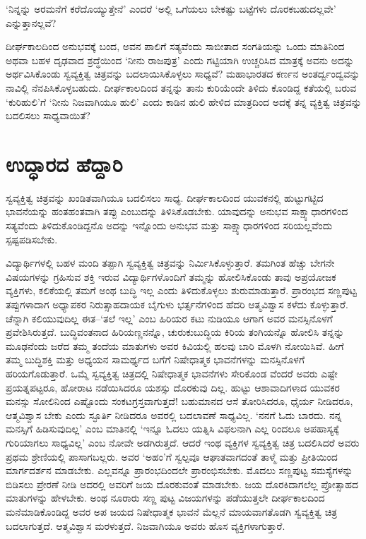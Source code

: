 ‘ನಿನ್ನನ್ನು ಅರಮನೆಗೆ ಕರೆದೊಯ್ಯುತ್ತೇನೆ’ ಎಂದರೆ ‘ಅಲ್ಲಿ ಒಗೆಯಲು ಬೇಕಷ್ಟು ಬಟ್ಟೆಗಳು ದೊರಕಬಹುದಲ್ಲವೇ’ ಎನ್ನುತ್ತಾನಲ್ಲವೆ?

ದೀರ್ಘಕಾಲದಿಂದ ಅನುಭವಕ್ಕೆ ಬಂದ, ಅವನ ಪಾಲಿಗೆ ಸತ್ಯವೆಂದು ಸಾಬೀತಾದ ಸಂಗತಿಯನ್ನು ಒಂದು ಮಾತಿನಿಂದ ಅಥವಾ ಬಹಳ ದೃಢವಾದ ಶ್ರದ್ಧೆಯಿಂದ ‘ನೀನು ರಾಜಪುತ್ರ’ ಎಂದು ಗಟ್ಟಿಯಾಗಿ ಉಚ್ಚರಿಸಿದ ಮಾತ್ರಕ್ಕೆ ಅವನು ಅದನ್ನು ಅರ್ಥವಿಸಿಕೊಂಡು ಸ್ವವ್ಯಕ್ತಿತ್ವ ಚಿತ್ರವನ್ನು ಬದಲಾಯಿಸಿಕೊಳ್ಳಲು ಸಾಧ್ಯವೆ? ಮಹಾಭಾರತದ ಕರ್ಣನ ಅಂತರ್ದ್ವಂದ್ವವನ್ನು ನಾವಿಲ್ಲಿ ನೆನಪಿಸಿಕೊಳ್ಳಬಹುದು. ದೀರ್ಘಕಾಲದಿಂದ ತನ್ನನ್ನು ತಾನು ಕುರಿಯೆಂದೇ ತಿಳಿದು ಕೊಂಡಿದ್ದ ಕತೆಯಲ್ಲಿ ಬರುವ ‘ಕುರಿಹುಲಿ’ಗೆ ‘ನೀನು ನಿಜವಾಗಿಯೂ ಹುಲಿ’ ಎಂದು ಕಾಡಿನ ಹುಲಿ ಹೇಳಿದ ಮಾತ್ರದಿಂದ ಅದಕ್ಕೆ ತನ್ನ ವ್ಯಕ್ತಿತ್ವ ಚಿತ್ರವನ್ನು ಬದಲಿಸಲು ಸಾಧ್ಯವಾಯಿತೆ?


\section*{ಉದ್ಧಾರದ ಹೆದ್ದಾರಿ}

ಸ್ವವ್ಯಕ್ತಿತ್ವ ಚಿತ್ರವನ್ನು ಖಂಡಿತವಾಗಿಯೂ ಬದಲಿಸಲು ಸಾಧ್ಯ. ದೀರ್ಘಕಾಲದಿಂದ ಯುವಕನಲ್ಲಿ ಹುಟ್ಟುಗಟ್ಟಿದ ಭಾವನೆಯನ್ನು ಹಂತಹಂತವಾಗಿ ತಪ್ಪು ಎಂಬುದನ್ನು ತಿಳಿಸಿಕೊಡಬೇಕು. ಯಾವುದನ್ನು ಅನುಭವ ಸಾಕ್ಷ್ಯಾಧಾರಗಳಿಂದ ಸತ್ಯವೆಂದು ತಿಳಿದುಕೊಂಡಿದ್ದನೊ ಅದನ್ನು ಇನ್ನೊಂದು ಅನುಭವ ಮತ್ತು ಸಾಕ್ಷ್ಯಾಧಾರಗಳಿಂದ ಸರಿಯಲ್ಲವೆಂದು ಸ್ಪಷ್ಟಪಡಿಸಬೇಕು.

ವಿದ್ಯಾರ್ಥಿಗಳಲ್ಲಿ ಬಹಳ ಮಂದಿ ತಪ್ಪಾಗಿ ಸ್ವವ್ಯಕ್ತಿತ್ವ ಚಿತ್ರವನ್ನು ನಿರ್ಮಿಸಿಕೊಳ್ಳುತ್ತಾರೆ. ತಮಗಿಂತ ಹೆಚ್ಚು ಬೇಗನೇ ವಿಷಯಗಳನ್ನು ಗ್ರಹಿಸುವ ಶಕ್ತಿ ಇರುವ ವಿದ್ಯಾರ್ಥಿಗಳೊಂದಿಗೆ ತಮ್ಮನ್ನು ಹೋಲಿಸಿಕೊಂಡು ತಾವು ಅಪ್ರಯೋಜಕ ವ್ಯಕ್ತಿಗಳು, ಕಲಿಕೆಯಲ್ಲಿ ತಮಗೆ ಅಂಥ ಬುದ್ಧಿ ಇಲ್ಲ ಎಂದು ತಿಳಿದುಕೊಳ್ಳಲು ಶುರುಮಾಡುತ್ತಾರೆ. ಪ್ರಾರಂಭದ ಸಣ್ಣಪುಟ್ಟ ತಪ್ಪುಗಳಾದಾಗ ಅಧ್ಯಾಪಕರ ನಿರುತ್ಸಾಹದಾಯಕ ಬೈಗುಳು ಭರ್ತ್ಸನೆಗಳಿಂದ ಹೆದರಿ ಆತ್ಮವಿಶ್ವಾಸ ಕಳೆದು ಕೊಳ್ಳುತ್ತಾರೆ. ಚೆನ್ನಾಗಿ ಕಲಿಯುವುದಿಲ್ಲ ಈತ–‘ತಲೆ ಇಲ್ಲ’ ಎಂಬ ಹಿರಿಯರ ಕಟು ನುಡಿಯೂ ಆಗಾಗ ಅವರ ಮನಸ್ಸಿ\-ನೊಳಗೆ ಪ್ರವೇಶಿಸಿರುತ್ತದೆ. ಬುದ್ಧಿವಂತನಾದ ಹಿರಿಯಣ್ಣನನ್ನೊ, ಚುರುಕುಬುದ್ಧಿಯ ಕಿರಿಯ ತಂಗಿಯನ್ನೊ ಹೋಲಿಸಿ ತನ್ನನ್ನು ಮೂಢನೆಂದು ಜರೆದ ತಮ್ಮ ತಂದೆಯ ಮಾತುಗಳು ಅವರ ಕಿವಿಯಲ್ಲಿ ಹಲವು ಬಾರಿ ಮೊಳಗಿ ನೋಯಿಸಿವೆ. ಹೀಗೆ ತಮ್ಮ ಬುದ್ಧಿಶಕ್ತಿ ಮತ್ತು ಅಧ್ಯಯನ ಸಾಮರ್ಥ್ಯದ ಬಗೆಗೆ ನಿಷೇಧಾತ್ಮಕ ಭಾವನೆಗಳನ್ನು ಮನಸ್ಸಿನೊಳಗೆ ಹರಿಯಗೊಡುತ್ತಾರೆ. ಒಮ್ಮೆ ಸ್ವವ್ಯಕ್ತಿತ್ವ ಚಿತ್ರದಲ್ಲಿ ನಿಷೇಧಾತ್ಮಕ ಭಾವನೆಗಳು ಸೇರಿಕೊಂಡ ವೆಂದರೆ ಅವರು ಎಷ್ಟೇ ಪ್ರಯತ್ನ\-ಪಟ್ಟರೂ, ಹೋರಾಟ ನಡೆಯಿಸಿದರೂ ಯಶಸ್ಸು ದೊರಕುವು ದಿಲ್ಲ. ಹುಟ್ಟು ಆಶಾವಾದಿಗಳಾದ ಯುವಕರ ಮನಸ್ಸು ಸೋಲಿನಿಂದ ಎಷ್ಟೊಂದು ಸಂಕಟಗ್ರಸ್ತವಾಗುತ್ತದೆ! ಬಹುಮಾನದ ಆಸೆ ತೋರಿಸಿದರೂ, ಧೈರ್ಯ ನೀಡಿದರೂ, ಆತ್ಮವಿಶ್ವಾಸ ಬೇಕು ಎಂದು ಸ್ಫೂರ್ತಿ ನೀಡಿದರೂ ಅವರಲ್ಲಿ ಬದಲಾವಣೆ ಸಾಧ್ಯವಿಲ್ಲ. ‘ನನಗೆ ಓದು ಬಾರದು. ನನ್ನ ಮನಸ್ಸಿಗೆ ಹಿಡಿಸುವುದಿಲ್ಲ’ ಎಂಬ ಮಾತಿನಲ್ಲಿ ‘ಇನ್ನೂ ಓದಲು ಯತ್ನಿಸಿ ವಿಫಲನಾಗಿ ಎಲ್ಲ ರಿಂದಲೂ ಅಪಹಾಸ್ಯಕ್ಕೆ ಗುರಿಯಾಗಲು ಸಾಧ್ಯವಿಲ್ಲ’ ಎಂಬ ನೋವೇ ಅಡಗಿರುತ್ತದೆ. ಆದರೆ ಇಂಥ ವ್ಯಕ್ತಿಗಳ ಸ್ವವ್ಯಕ್ತಿತ್ವ ಚಿತ್ರ ಬದಲಿಸಿದರೆ ಅವರು ಪ್ರಥಮ ಶ್ರೇಣಿಯಲ್ಲಿ ಪಾಸಾಗಬಲ್ಲರು. ಅವರ ‘ಅಹಂ’ಗೆ ಸ್ವಲ್ಪವೂ ಆಘಾತವಾಗದಂತೆ ತಾಳ್ಮೆ ಮತ್ತು ಪ್ರೀತಿಯಿಂದ ಮಾರ್ಗದರ್ಶನ ಮಾಡಬೇಕು. ಎಲ್ಲವನ್ನೂ ಪ್ರಾರಂಭದಿಂದಲೇ ಪ್ರಾರಂಭಿಸಬೇಕು. ಮೊದಲು ಸಣ್ಣಪುಟ್ಟ ಸಮಸ್ಯೆಗಳನ್ನು ಬಿಡಿಸಲು ಪ್ರೇರಣೆ ನೀಡಿ ಅದರಲ್ಲಿ ಅವರಿಗೆ ಜಯ ದೊರಕುವಂತೆ ಮಾಡಬೇಕು. ಜಯ ದೊರಕಿದಾಗಲೆಲ್ಲ ಪ್ರೋತ್ಸಾಹದ ಮಾತುಗಳನ್ನು ಹೇಳಬೇಕು. ಅಂಥ ನೂರಾರು ಸಣ್ಣ ಪುಟ್ಟ ವಿಜಯಗಳನ್ನು ಪಡೆಯುತ್ತಲೇ ದೀರ್ಘಕಾಲದಿಂದ ಮನೆಮಾಡಿಕೊಂಡಿದ್ದ ಅವರ ಅಪ ಜಯದ ನಿಷೇಧಾತ್ಮಕ ಭಾವನೆ ಮೆಲ್ಲನೆ ಮಾಯವಾಗತೊಡಗಿ ಸ್ವವ್ಯಕ್ತಿತ್ವ ಚಿತ್ರ ಬದಲಾಗುತ್ತದೆ. ಆತ್ಮವಿಶ್ವಾಸ ಮರಳುತ್ತದೆ. ನಿಜವಾಗಿಯೂ ಅವರು ಹೊಸ ವ್ಯಕ್ತಿಗಳಾಗುತ್ತಾರೆ.

